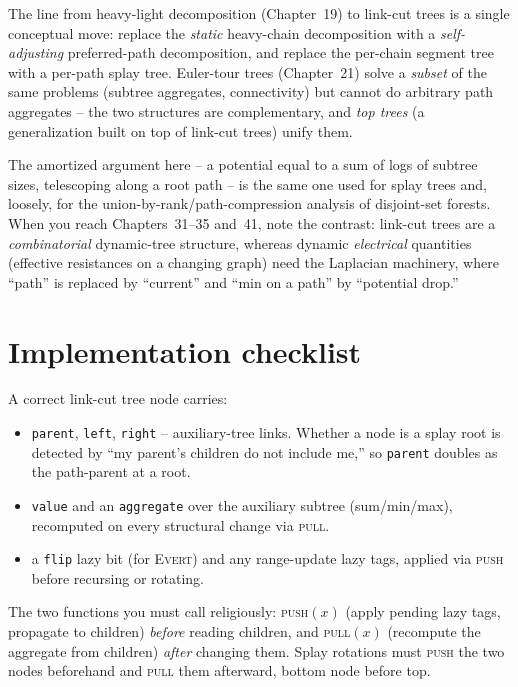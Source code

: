 \begin{connectionbox}
The line from heavy-light decomposition (Chapter~19) to link-cut trees is a single
conceptual move: replace the \emph{static} heavy-chain decomposition with a
\emph{self-adjusting} preferred-path decomposition, and replace the per-chain
segment tree with a per-path splay tree. Euler-tour trees (Chapter~21) solve a
\emph{subset} of the same problems (subtree aggregates, connectivity) but cannot
do arbitrary path aggregates -- the two structures are complementary, and
\emph{top trees} (a generalization built on top of link-cut trees) unify them.

The amortized argument here -- a potential equal to a sum of logs of subtree sizes,
telescoping along a root path -- is the same one used for splay trees and,
loosely, for the union-by-rank/path-compression analysis of disjoint-set
forests. When you reach Chapters~31--35 and~41, note the contrast: link-cut trees
are a \emph{combinatorial} dynamic-tree structure, whereas dynamic
\emph{electrical} quantities (effective resistances on a changing graph) need the
Laplacian machinery, where ``path'' is replaced by ``current'' and ``min on a
path'' by ``potential drop.''
\end{connectionbox}

\section{Implementation checklist}
\label{ch22:impl}

\begin{focusbox}
A correct link-cut tree node carries:
\begin{itemize}
  \item \texttt{parent}, \texttt{left}, \texttt{right} -- auxiliary-tree links.
        Whether a node is a splay root is detected by ``my parent's children do
        not include me,'' so \texttt{parent} doubles as the path-parent at a
        root.
  \item \texttt{value} and an \texttt{aggregate} over the auxiliary subtree
        (sum/min/max), recomputed on every structural change via \textsc{pull}.
  \item a \texttt{flip} lazy bit (for \textsc{Evert}) and any range-update lazy
        tags, applied via \textsc{push} before recursing or rotating.
\end{itemize}
The two functions you must call religiously: \textsc{push}$(x)$ (apply pending
lazy tags, propagate to children) \emph{before} reading children, and
\textsc{pull}$(x)$ (recompute the aggregate from children) \emph{after} changing
them. Splay rotations must \textsc{push} the two nodes beforehand and \textsc{pull}
them afterward, bottom node before top.
\end{focusbox}

